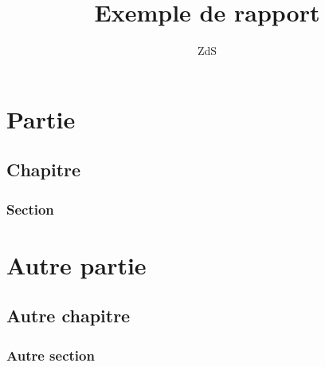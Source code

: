 \documentclass[a4paper, 12pt, french]{report}
\title{Exemple de rapport}
\author{ZdS}
\begin{document}
   \maketitle
   \tableofcontents
   \part{Partie}
      \chapter{Chapitre}
         \section{Section} 
   \part{Autre partie}
      \chapter{Autre chapitre}
         \section{Autre section} 
\end{document}
